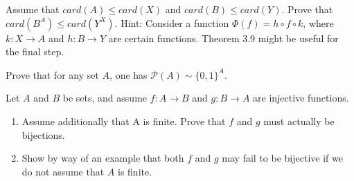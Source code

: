 \documentclass[12pt,letterpaper,boxed]{hmcpset}
\begin{document}
\begin{problem}[Exercise 4.5]
Assume that $card(A) \leq card(X)$ and $card(B) \leq card(Y).$ Prove that $card(B^{A}) \leq card(Y^{X})$. Hint: Consider a function $\Phi(f) = h \circ f \circ k$,
where $k : X \rightarrow A$ and $h : B \rightarrow Y$ are certain functions. Theorem 3.9 might be useful for the final step.
 \end{problem}

\begin{solution}
\end{solution}

\begin{problem}[Exercise 4.7]
Prove that for any set $A$, one has $\mathcal{P}(A) \sim \{0,1\}^{A}$.
\end{problem}

\begin{solution}
\end{solution}

\begin{problem}[Exercise 4.17]
Let $A$ and $B$ be sets, and assume $f: A \rightarrow B$ and $g: B \rightarrow A$ are injective functions.
\vspace{-2mm}
\begin{enumerate}
	\itemsep0em
	\item Assume additionally that A is finite. Prove that $f$ and $g$ must actually be bijections.
	\item Show by way of an example that both $f$ and $g$ may fail to be bijective if we do not assume that $A$ is finite.
\end{enumerate}
\end{problem}
\end{document}
